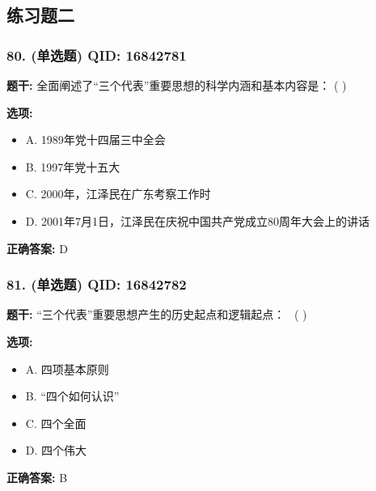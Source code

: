 \documentclass[12pt,UTF8]{ctexart}
\begin{document}
\subsection*{练习题二}

\subsubsection*{80. (单选题) \small QID: 16842781}

\textbf{题干:}
全面阐述了“三个代表”重要思想的科学内涵和基本内容是： ( )

\textbf{选项:}
\begin{itemize}[leftmargin=*]

  \item A. 1989年党十四届三中全会

  \item B. 1997年党十五大

  \item C. 2000年，江泽民在广东考察工作时

  \item D. 2001年7月1日，江泽民在庆祝中国共产党成立80周年大会上的讲话

\end{itemize}

\textbf{正确答案:}
D

\vspace{0.3em}\hrulefill\vspace{0.7em}

\subsubsection*{81. (单选题) \small QID: 16842782}

\textbf{题干:}
“三个代表”重要思想产生的历史起点和逻辑起点：  ( )

\textbf{选项:}
\begin{itemize}[leftmargin=*]

  \item A. 四项基本原则

  \item B. “四个如何认识”

  \item C. 四个全面

  \item D. 四个伟大

\end{itemize}

\textbf{正确答案:}
B

\vspace{0.3em}\hrulefill\vspace{0.7em}
\end{document}
